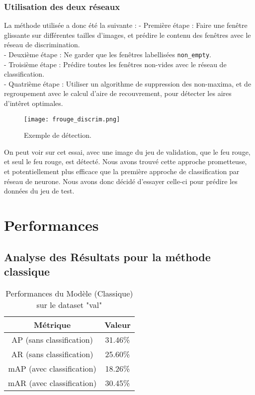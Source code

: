 \documentclass[twocolumn,10pt]{article}
\begin{document}
    \subsubsection{Utilisation des deux réseaux}
    La méthode utilisée a donc été la suivante :
    - Première étape : Faire une fenêtre glissante sur différentes tailles d'images, et prédire le contenu des fenêtres avec le réseau de discrimination.\\
    - Deuxième étape : Ne garder que les fenêtres labellisées \texttt{non\_empty}.\\
    - Troisième étape : Prédire toutes les fenêtres non-vides avec le réseau de classification.\\
    - Quatrième étape : Utiliser un algorithme de suppression des non-maxima, et de regroupement avec le calcul d'aire de recouvrement, pour détecter les aires d'intêret optimales.

    \begin{figure}[H]
        \centering
        \texttt{[image: frouge\_discrim.png]}
        \caption{Exemple de détection.}
        \label{fig:emptyornot}
    \end{figure}

    On peut voir sur cet essai, avec une image du jeu de validation, que le feu rouge, et seul le feu rouge, est détecté.
    Nous avons trouvé cette approche prometteuse, et potentiellement plus efficace que la première approche de classification par réseau de neurone. Nous avons donc décidé d'essayer celle-ci pour prédire les données du jeu de test.

    \section{Performances}
    \subsection{Analyse des Résultats pour la méthode classique}

    \begin{table}[h!]
        \centering
        \begin{tabular}{|c|c|}
            \hline
            \textbf{Métrique} & \textbf{Valeur} \\ \hline
            AP (sans classification) & 31.46\% \\ \hline
            AR (sans classification) & 25.60\% \\ \hline
            mAP (avec classification) & 18.26\% \\ \hline
            mAR (avec classification) & 30.45\% \\ \hline
        \end{tabular}
        \caption{Performances du Modèle (Classique) sur le dataset "val"}
        \label{tab:performances}
    \end{table}
\end{document}
